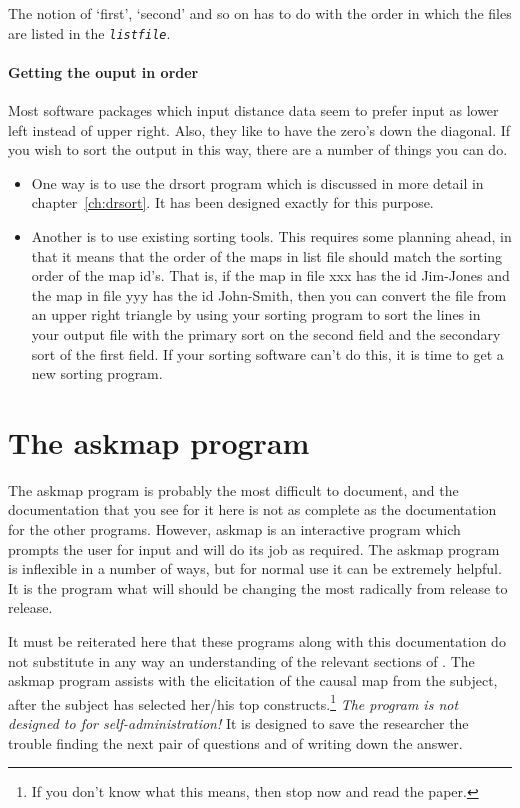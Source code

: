\documentclass[%
	11pt,
        a4paper,
        twoside]{workrep}
\newcommand*{\prg}[1]{\textsf{#1}}		%
\begin{document}
The notion of `first', `second' and so on has to do with the order
in which the files are listed in the \textit{\tt listfile}.

\subsubsection{Getting the ouput in order}\label{sec:sortdrout}

Most software packages which input distance data seem to prefer input
as lower left instead of upper right.  Also, they like to have the
zero's down the diagonal.  
If you wish to sort the output in this way, there are a number
of things you can do.

\begin{itemize}
\item One way is to use the \prg{drsort} program which is discussed
  in more detail in chapter~\ref{ch:drsort}.   It has been designed
  exactly for this purpose.

\item Another is to use existing sorting tools.  This requires some planning
  ahead, in that it means that the order of the maps in list file
  should match the sorting order of the map id's.  That is, if the map
  in file xxx has the id Jim-Jones and the map in file yyy has the id
  John-Smith, then you can convert the file from an upper right
  triangle by using your sorting program to sort the lines in your
  output file with the primary sort on the second field and the
  secondary sort of the first field.  If your sorting software can't do
  this, it is time to get a new sorting program.

\end{itemize}

\chapter{The \prg{askmap} program} \label{ch:askmap}

The \prg{askmap} program is probably the most difficult to document, and
the documentation that you see for it here is not as complete as the
documentation for the other programs.  However, \prg{askmap} is an
interactive program which prompts the user for input and will do its
job as required.  The \prg{askmap} program is inflexible in a number
of ways, but for normal use it can be extremely helpful.  It is the program
what will should be changing the most radically from release to release.

It must be reiterated here that these programs along with this
documentation do not substitute in any way an understanding of
the relevant sections of .
The \prg{askmap} program assists with the elicitation of the
causal map from the subject, after the subject has selected
her/his top constructs.\footnote{%
 If you don't know what this means, then stop now and read
 the paper.}
\emph{The program is not designed to for self-administration!}  It is
designed to save the researcher the trouble finding the next pair
of questions and of writing down the answer.
\end{document}

